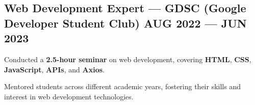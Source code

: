 \documentclass[letter,10pt]{article}
\begin{document}
\subsection{{Web Development Expert --- GDSC (Google Developer Student Club) \hfill AUG 2022 --- JUN 2023}}
\begin{zitemize}
  \item Conducted a \textbf{2.5-hour seminar} on web development, covering \textbf{HTML}, \textbf{CSS}, \textbf{JavaScript}, \textbf{APIs}, and \textbf{Axios}.
  \item Mentored students across different academic years, fostering their skills and interest in web development technologies.
\end{zitemize}
\end{document}
